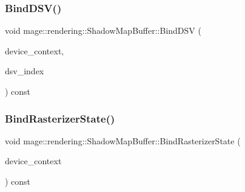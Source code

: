 \hypertarget{classmage_1_1rendering_1_1_shadow_map_buffer_a8aec694d4bc459fefbecb0845c962148}{}\label{classmage_1_1rendering_1_1_shadow_map_buffer_a8aec694d4bc459fefbecb0845c962148} 
\subsubsection{\texorpdfstring{Bind\+D\+S\+V()}{BindDSV()}}
{\footnotesize\ttfamily void mage\+::rendering\+::\+Shadow\+Map\+Buffer\+::\+Bind\+D\+SV (\begin{DoxyParamCaption}\item[{I\+D3\+D11\+Device\+Context \&}]{device\+\_\+context,  }\item[{size\+\_\+t}]{dsv\+\_\+index }\end{DoxyParamCaption}) const\hspace{0.3cm}{\ttfamily [noexcept]}}

\hypertarget{classmage_1_1rendering_1_1_shadow_map_buffer_a5216f8d02a3e92a8dcd34dcc6889563c}{}\label{classmage_1_1rendering_1_1_shadow_map_buffer_a5216f8d02a3e92a8dcd34dcc6889563c} 
\subsubsection{\texorpdfstring{Bind\+Rasterizer\+State()}{BindRasterizerState()}}
{\footnotesize\ttfamily void mage\+::rendering\+::\+Shadow\+Map\+Buffer\+::\+Bind\+Rasterizer\+State (\begin{DoxyParamCaption}\item[{I\+D3\+D11\+Device\+Context \&}]{device\+\_\+context }\end{DoxyParamCaption}) const\hspace{0.3cm}{\ttfamily [noexcept]}}

\hypertarget{classmage_1_1rendering_1_1_shadow_map_buffer_a1af9b2bbeaefb1367dbf6c66a2191bcc}{}\label{classmage_1_1rendering_1_1_shadow_map_buffer_a1af9b2bbeaefb1367dbf6c66a2191bcc} 
